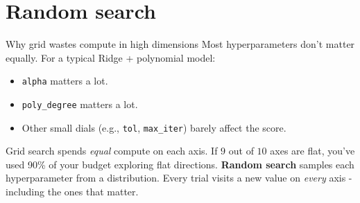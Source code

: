 \documentclass[aspectratio=169]{beamer}
\begin{document}
\section{Random search}

\begin{frame}{Why grid wastes compute in high dimensions}
  Most hyperparameters don't matter equally. For a typical Ridge + polynomial model:
  \begin{itemize}
    \item \texttt{alpha} matters a lot.
    \item \texttt{poly\_degree} matters a lot.
    \item Other small dials (e.g., \texttt{tol}, \texttt{max\_iter}) barely affect the score.
  \end{itemize}
  \vfill
  Grid search spends \emph{equal} compute on each axis. If $9$ out of $10$ axes are flat, you've used 90\% of your budget exploring flat directions.
  \vfill
  \textbf{Random search} samples each hyperparameter from a distribution. Every trial visits a new value on \emph{every} axis - including the ones that matter.
\end{frame}
\end{document}
